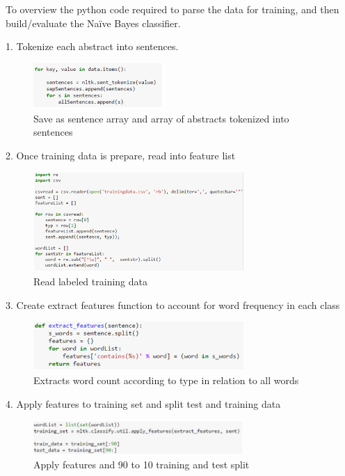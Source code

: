 \documentclass{article} %
\begin{document}
To overview the python code required to parse the data for training, and then build/evaluate the Naïve Bayes classifier.

1.	Tokenize each abstract into sentences. 
 
\begin{figure}[h!]
\centering
\includegraphics[width=50mm]{Screenshot_127.png}
\caption{Save as sentence array and array of abstracts tokenized into sentences}
\end{figure}

2.	Once training data is prepare, read into feature list
 
\begin{figure}[h!]
\centering
\includegraphics[width=80mm]{Screenshot_126.png}
\caption{Read labeled training data}
\end{figure}

\vspace{20mm}
\vspace{20mm}

3.	Create extract features function to account for word frequency in each class
 
\begin{figure}[h!]
\centering
\includegraphics[width=80mm]{Screenshot_125.png}
\caption{Extracts word count according to type in relation to all words}
\end{figure}

4.	Apply features to training set and split test and training data
 
\begin{figure}[h!]
\centering
\includegraphics[width=80mm]{Screenshot_124.png}
\caption{Apply features and 90 to 10 training and test split}
\end{figure}
\end{document}
